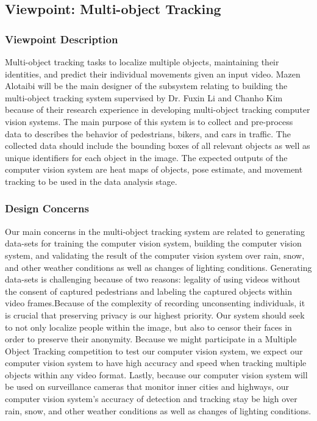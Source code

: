 \documentclass[onecolumn, draftclsnofoot,10pt, compsoc]{IEEEtran}
\begin{document}
\subsection{Viewpoint: Multi-object Tracking}
\subsubsection{Viewpoint Description}
Multi-object tracking tasks to localize multiple objects, maintaining their identities, and predict their individual movements given an input video. Mazen Alotaibi will be the main designer of the subsystem relating to building the multi-object tracking system supervised by Dr. Fuxin Li and Chanho Kim because of their research experience in developing multi-object tracking computer vision systems. The main purpose of this system is to collect and pre-process data to describes the behavior of pedestrians, bikers, and cars in traffic. The collected data should include the bounding boxes of all relevant objects as well as unique identifiers for each object in the image. The expected outputs of the computer vision system are heat maps of objects, pose estimate, and movement tracking to be used in the data analysis stage.
\subsubsection{Design Concerns}
Our main concerns in the multi-object tracking system are related to generating data-sets for training the computer vision system, building the computer vision system, and validating the result of the computer vision system over rain, snow, and other weather conditions as well as changes of lighting conditions. Generating data-sets is challenging because of two reasons: legality of using videos without the consent of captured pedestrians and labeling the captured objects within video frames.Because of the complexity of recording unconsenting individuals, it is crucial that preserving privacy is our highest priority. Our system should seek to not only localize people within the image, but also to censor their faces in order to preserve their anonymity. Because we might participate in a Multiple Object Tracking competition to test our computer vision system, we expect our computer vision system to have high accuracy and speed when tracking multiple objects within any video format. Lastly, because our computer vision system will be used on surveillance cameras that monitor inner cities and highways, our computer vision system's accuracy of detection and tracking stay be high over rain, snow, and other weather conditions as well as changes of lighting conditions. 
\end{document}
